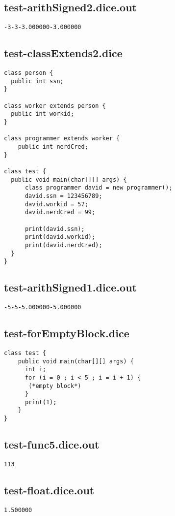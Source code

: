 \subsection{test-arithSigned2.dice.out}
\begin{verbatim}
-3-3-3.000000-3.000000
\end{verbatim}
\pagebreak
\subsection{test-classExtends2.dice}
\begin{verbatim}
class person {
  public int ssn;
}

class worker extends person {
  public int workid;
}

class programmer extends worker {
	public int nerdCred;
}

class test {
  public void main(char[][] args) {
      class programmer david = new programmer();
      david.ssn = 123456789;
      david.workid = 57;
      david.nerdCred = 99;

      print(david.ssn);
      print(david.workid);
      print(david.nerdCred);
  }
}
\end{verbatim}
\pagebreak
\subsection{test-arithSigned1.dice.out}
\begin{verbatim}
-5-5-5.000000-5.000000
\end{verbatim}
\pagebreak
\subsection{test-forEmptyBlock.dice}
\begin{verbatim}
class test {
	public void main(char[][] args) {
	  int i;
	  for (i = 0 ; i < 5 ; i = i + 1) {
	   (*empty block*)
	  }
	  print(1);
	}
}
\end{verbatim}
\pagebreak
\subsection{test-func5.dice.out}
\begin{verbatim}
113
\end{verbatim}
\pagebreak
\subsection{test-float.dice.out}
\begin{verbatim}
1.500000
\end{verbatim}
\pagebreak
